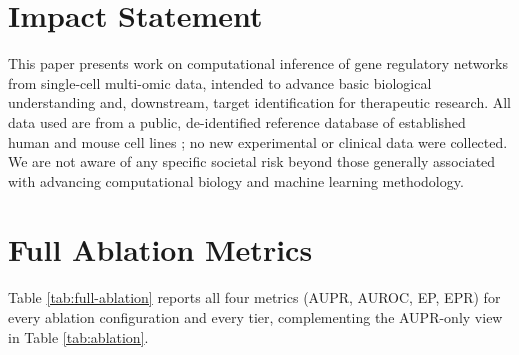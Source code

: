 \documentclass{article}
\theoremstyle{plain}
\theoremstyle{definition}
\begin{document}
\section*{Impact Statement}
This paper presents work on computational inference of gene regulatory
networks from single-cell multi-omic data, intended to advance basic
biological understanding and, downstream, target identification for
therapeutic research. All data used are from a public, de-identified
reference database of established human and mouse cell lines
\cite{valensi2026scmogrndb}; no new experimental or clinical data were
collected. We are not aware of any specific societal risk beyond those
generally associated with advancing computational biology and machine
learning methodology.




\newpage
\appendix
\onecolumn
\section{Full Ablation Metrics}
\label{app:full-ablation}

Table \ref{tab:full-ablation} reports all four metrics (AUPR, AUROC, EP, EPR)
for every ablation configuration and every tier, complementing the AUPR-only
view in Table \ref{tab:ablation}.
\end{document}
